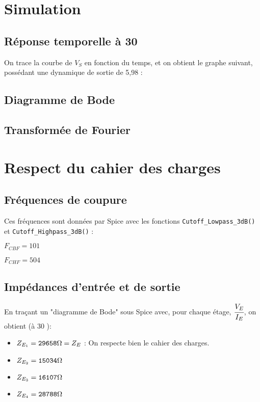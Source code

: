 \documentclass[11pt;a4paper]{report}
\begin{document}
  \section{Simulation}
   \subsection{Réponse temporelle à 30\kilo\hertz}
    On trace la courbe de $V_S$ en fonction du temps, et on obtient le graphe suivant, possédant une dynamique de sortie de 5,98 \volt :
    
   \subsection{Diagramme de Bode}

   \subsection{Transformée de Fourier}

  \section{Respect du cahier des charges}
   \subsection{Fréquences de coupure}
    Ces fréquences sont données par Spice avec les fonctions \verb|Cutoff_Lowpass_3dB()| et \verb|Cutoff_Highpass_3dB()| :

    $F_{CBF} = 101$ \hertz

    $F_{CHF} = 504$ \kilo\hertz

   \subsection{Impédances d'entrée et de sortie}
    En traçant un "diagramme de Bode" sous Spice avec, pour chaque étage, $\cfrac{V_E}{I_E}$, on obtient (à 30 \kilo\hertz):
    \begin{itemize}
     \item $Z_{E_1} = \verb|29658|\ohm = Z_E$ : On respecte bien le cahier des charges.
     \item $Z_{E_2} = \verb|15034|\ohm$
     \item $Z_{E_3} = \verb|16107|\ohm$
     \item $Z_{E_4} = \verb|28788|\ohm$
    \end{itemize}
\end{document}
